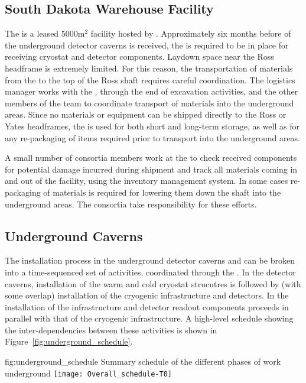 \subsection{South Dakota Warehouse Facility}
\label{sec:sdwf}

The  is a leased 5000m$^2$ facility hosted by 
.  Approximately six months before 
of the underground detector caverns is received, the  
is required to be in place for receiving cryostat and detector 
components.  Laydown space near the Ross headframe is extremely 
limited.  For this reason, the transportation of materials from 
the  to the top of the Ross shaft requires careful 
coordination. The  logistics manager works with 
the , through the end of excavation activities, and 
the other members of the  team to coordinate transport 
of materials into the underground areas.  Since no materials or 
equipment can be shipped directly to the Ross or Yates headframes, 
the  is used for both short and long-term storage, as 
well as for any re-packaging of items required prior to transport 
into the underground areas. 

A small number of  consortia members work at the
 to check received components for potential damage
incurred during shipment and track all materials coming in and out of
the facility, using the inventory management system.  In some cases
re-packaging of materials is required for lowering them down the shaft
into the underground areas.  The  consortia take
responsibility for these efforts.

\subsection{Underground Caverns}

The installation 
process in the underground detector caverns and  can 
be broken into a time-sequenced set of activities, coordinated 
through the .  In the detector caverns, installation 
of the warm and cold cryostat strucutres is followed by (with 
some overlap) installation of the cryogenic infrastructure and 
detectors.  In the  installation of the   
infrastructure and detector readout components proceeds in 
parallel with that of the cryogenic infrastructure.  A high-level 
schedule showing the inter-dependencies between these activities 
is shown in Figure~\ref{fig:underground_schedule}.
\begin{dunefigure}{fig:underground_schedule}
  {Summary schedule of the different phases of work underground}
  \texttt{[image: Overall\_schedule-T0]}
\end{dunefigure}

